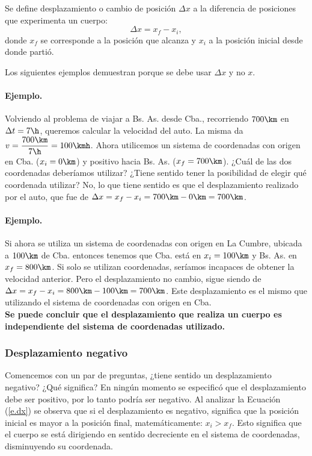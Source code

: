 Se define desplazamiento o cambio de posición $\Delta x$ a la diferencia
de posiciones que experimenta un cuerpo:
\begin{equation}
  \Delta x = x_f - x_i,
  \label{e.dx}
\end{equation}
donde $x_f$ se corresponde a la posición que alcanza y $x_i$ a la posición
inicial desde donde partió.

Los siguientes ejemplos demuestran porque se debe usar $\Delta x$ y no $x$.


\paragraph{Ejemplo.} 
Volviendo al problema de viajar a Bs. As. desde Cba., recorriendo $700\km$ en
$\Delta t =7\h$, queremos calcular la velocidad del auto. La misma da
$v=\dfrac{700\km}{7\h}=100\kmh$. Ahora utilicemos un sistema de coordenadas con
origen en Cba. ($x_i=0\km$) y positivo hacia Bs. As. ($x_f=700\km$). ¿Cuál de
las dos coordenadas deberíamos utilizar? ¿Tiene sentido tener la posibilidad de
elegir qué coordenada utilizar? No, lo que tiene sentido es que el
desplazamiento realizado por el auto, que fue de $\Delta x= x_f - x_i =
700\km - 0\km = 700\km$. \finej

\paragraph{Ejemplo.} 
Si ahora se utiliza un sistema de coordenadas con origen en La Cumbre, ubicada a
$100\km$ de Cba. entonces tenemos que Cba. está en $x_i=100\km$ y Bs. As. en
$x_f=800\km$. Si solo se utilizan coordenadas, seríamos incapaces de obtener la
velocidad anterior. Pero el desplazamiento no cambio, sigue siendo de $\Delta x
= x_f - x_i = 800\km - 100\km = 700\km$. Este desplazamiento es el mismo que
utilizando el sistema de coordenadas con origen en Cba.
\finej \\

{\bf Se puede concluir que el desplazamiento que realiza un cuerpo es
independiente del sistema de coordenadas utilizado.}

\subsubsection{Desplazamiento negativo}

Comencemos con un par de preguntas, ¿tiene sentido un desplazamiento negativo?
¿Qué significa? En ningún momento se especificó que el desplazamiento debe ser
positivo, por lo tanto podría ser negativo. Al analizar la Ecuación (\ref{e.dx})
se observa que si el desplazamiento es negativo, significa que la posición
inicial es mayor a la posición final, matemáticamente: $x_i>x_f$. Esto significa
que el cuerpo se está dirigiendo en sentido decreciente en el sistema de
coordenadas, disminuyendo su coordenada.

